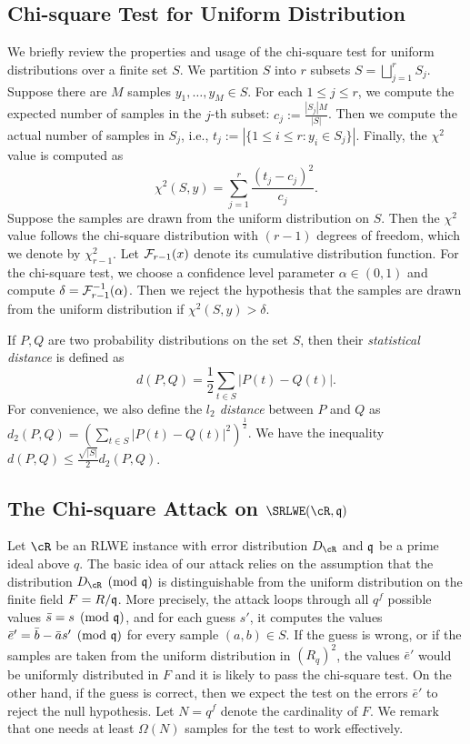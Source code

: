 \documentclass[envcountsect]{llncs}
\begin{document}
\subsection{Chi-square Test for Uniform Distribution}
We briefly review the properties and usage of the chi-square test for uniform distributions over a finite set $S$. We partition $S$ into $r$ subsets $S = \bigsqcup_{j=1}^r S_j$.
Suppose there are $M$ samples $y_1, \ldots, y_M \in S$.
For each $1 \leq j \leq r$, we compute the expected number of samples in the $j$-th subset: $c_j := \frac{|S_j|M}{|S|}$. Then we compute the actual number of samples in $S_j$, i.e., $t_j := |\{1 \leq i \leq r: y_i \in S_j\}|$. Finally, the $\chi^2$ value is computed as
\[
    \chi^2(S,y) = \sum_{j = 1}^r \frac{(t_j -c_j)^2}{c_j}.
\]
Suppose the samples are drawn from the uniform distribution on $S$. Then the $\chi^2$ value follows the chi-square distribution with $(r-1)$ degrees of freedom, which we denote by $\chi_{r-1}^2$. Let $\mathcal{F}_{r-1}(x)$ denote its cumulative distribution function. For the chi-square test, we choose a confidence level parameter $\alpha \in (0,1)$ and compute $\delta = \mathcal{F}_{r-1}^{-1}(\alpha)$. Then we reject the hypothesis that the samples are drawn from the uniform distribution if $\chi^2(S,y)  > \delta$. 

If $P,Q$ are two probability distributions on the set $S$, then their {\it statistical distance} is defined as
\[
    d(P,Q) = \frac{1}{2} \sum_{t \in S} |P(t) - Q(t)|.
\]
For convenience, we also define the {\it $l_2$ distance} between $P$ and $Q$ as $d_2(P,Q) = (\sum_{t \in S} |P(t) - Q(t)|^2)^{\frac{1}{2}}$. We have the inequality $d(P,Q) \leq \frac{\sqrt{|S|}}{2}d_2(P,Q)$.


\subsection{The Chi-square Attack on $\SRLWE(\cR,\fq)$}

Let $\cR$ be an RLWE instance with error distribution $D_{\cR}$ and $\mathfrak{q}$ be a prime ideal above $q$.  The basic idea of our attack relies on the assumption that the distribution $D_\cR \pmod {\fq}$ is distinguishable from the uniform distribution on the finite field $F = R/\mathfrak{q}$. More precisely, the attack loops through all $q^f$ possible values $\bar{s} = s \pmod{\mathfrak{q}}$, and for each guess $s'$, it computes the values $\bar{e}' = \bar{b} - \bar{a} s' \pmod {\mathfrak{q}}$ for every sample $(a,b) \in S$. If the guess is wrong, or if the samples are taken from the uniform distribution in $(R_q)^2$, the values $\bar{e}'$ would be uniformly distributed in $F$ and it is likely to pass the chi-square test. On the other hand, if the guess is correct, then we expect the test on the errors $\bar{e}'$ to reject the null hypothesis. Let $N = q^f$ denote the cardinality of $F$. We remark that one needs at least $\Omega(N)$ samples for the test to work effectively. 
\end{document}
